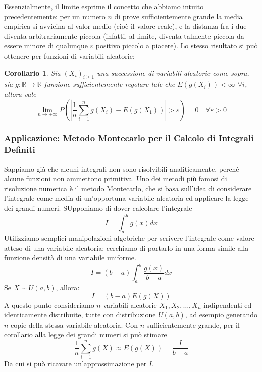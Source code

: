 \documentclass{article}
\theoremstyle{plain}
\newtheorem*{corollario}{Corollario}
\theoremstyle{definition}
\theoremstyle{remark}
\begin{document}
Essenzialmente, il limite esprime il concetto che abbiamo intuito precedentemente: per un numero $n$ di prove sufficientemente grande la media empirica si avvicina al valor medio (cioè il valore reale), e la distanza fra i due diventa arbitrariamente piccola (infatti, al limite, diventa talmente piccola da essere minore di qualunque $\varepsilon$ positivo piccolo a piacere). Lo stesso risultato si può ottenere per funzioni di variabili aleatorie:
\begin{corollario}
	Sia $(X_i)_{i\geq1}$ una successione di variabili aleatorie come sopra, sia $g:\mathds{R}\to\mathds{R}$ funzione sufficientemente regolare tale che $E(g(X_i))<\infty$ $\forall i$, allora vale
	\begin{equation*}
		\lim_{n\to+\infty}P\left(\left|\frac{1}{n}\sum_{i=1}^ng(X_i)-E(g(X_1))\right|>\varepsilon\right)=0\quad\forall\varepsilon>0
	\end{equation*}
\end{corollario}
\subsubsection{Applicazione: Metodo Montecarlo per il Calcolo di Integrali Definiti} %
\label{ssub:applicazione_metodo_montecarlo_per_il_calcolo_di_integrali_definiti}
Sappiamo già che alcuni integrali non sono risolvibili analiticamente, perché alcune funzioni non ammettono primitiva. Uno dei metodi più famosi di risoluzione numerica è il metodo Montecarlo, che si basa sull'idea di considerare l'integrale come media di un'opportuna variabile aleatoria ed applicare la legge dei grandi numeri. SUpponiamo di dover calcolare l'integrale
\begin{equation*}
	I=\int_a^bg(x)dx
\end{equation*}
Utilizziamo semplici manipolazioni algebriche per scrivere l'integrale come valore atteso di una variabile aleatoria: cerchiamo di portarlo in una forma simile alla funzione densità di una variabile uniforme.
\begin{equation*}
	I=(b-a)\int_a^b\frac{g(x)}{b-a}dx
\end{equation*}
Se $X\sim U(a,b)$, allora:
\begin{equation*}
	I=(b-a)E(g(X))
\end{equation*}
A questo punto consideriamo $n$ variabili aleatorie $X_1,X_2,\dots,X_n$ indipendenti ed identicamente distribuite, tutte con distribuzione $U(a,b)$, ad esempio generando $n$ copie della stessa variabile aleatoria. Con $n$ sufficientemente grande, per il corollario alla legge dei grandi numeri si può stimare
\begin{equation*}
	\frac{1}{n}\sum_{i=1}^ng(X)\approx E(g(X))=\frac{I}{b-a}
\end{equation*}
Da cui si può ricavare un'approssimazione per $I$.
\end{document}
